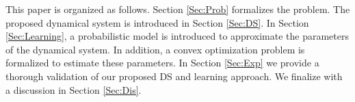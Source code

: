 \documentclass[letterpaper, 10 pt, conference,fleqn]{ieeeconf}
\begin{document}
This paper is organized as follows. Section \ref{Sec:Prob} formalizes the problem. The proposed dynamical system is introduced in Section \ref{Sec:DS}. In Section \ref{Sec:Learning}, a probabilistic model is introduced to approximate the parameters of the dynamical system. In addition, a convex optimization problem is  formalized to estimate these parameters. In Section \ref{Sec:Exp} we provide a thorough validation of our proposed DS and learning approach. We finalize with a discussion in Section \ref{Sec:Dis}.

\end{document}

